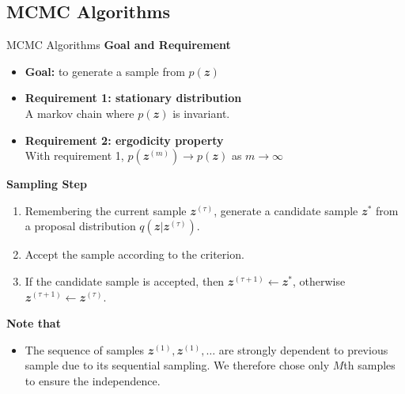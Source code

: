 \documentclass{bredelebeamer}
\begin{document}
\subsection{MCMC Algorithms}
\begin{frame}{MCMC Algorithms}
  \textbf{Goal and Requirement}
  \begin{itemize}
    \item \textbf{Goal:} to generate a sample from $p(\mathbfit{z})$
    \item \textbf{Requirement 1: stationary distribution} \\
    A markov chain where $p(\mathbfit{z})$ is invariant.
    \item \textbf{Requirement 2: ergodicity property} \\
    With requirement 1, $p(\mathbfit{z}^{(m)}) \rightarrow p(\mathbfit{z})$ as $m \rightarrow \infty$
  \end{itemize}

  \textbf{Sampling Step}
  \begin{enumerate}
    \item Remembering the current sample $\mathbfit{z}^{(\tau)}$, generate
    a candidate sample $\mathbfit{z}^{*}$ from a proposal distribution
    $q(\mathbfit{z}|\mathbfit{z}^{(\tau)})$.
    \item Accept the sample according to the criterion.
    \item If the candidate sample is accepted, then
    $\mathbfit{z}^{(\tau+1)} \leftarrow \mathbfit{z}^{*}$,
    otherwise
    $\mathbfit{z}^{(\tau+1)} \leftarrow \mathbfit{z}^{(\tau)}$.
  \end{enumerate}

  \textbf{Note that}
  \begin{itemize}
    \item The sequence of samples $\mathbfit{z}^{(1)}, \mathbfit{z}^{(1)}, \ldots$
    are strongly dependent to previous sample due to its sequential sampling.
    We therefore chose only $M$th samples to ensure the independence.
  \end{itemize}
\end{frame}
\end{document}
